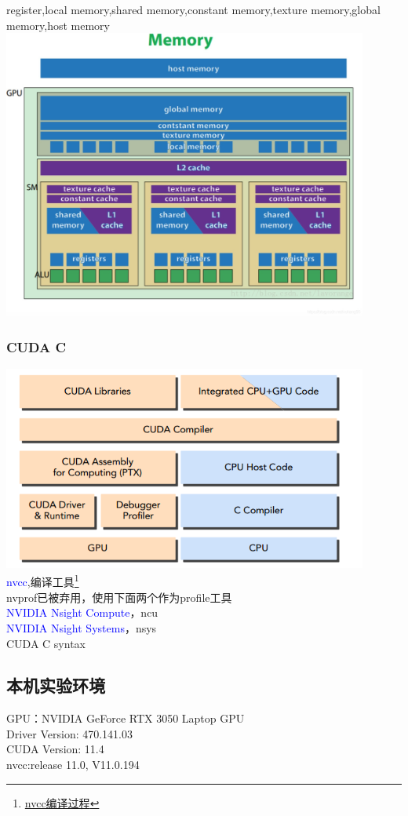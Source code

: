 register,local memory,shared memory,constant memory,texture memory,global memory,host memory\\
\includegraphics[width=0.9\textwidth]{assets/mem.jpg}\\

\subsubsection{CUDA C}
\noindent

\includegraphics[width=0.9\textwidth]{assets/cudac.png}\\
\textcolor{blue}{nvcc},编译工具\footnote{\href{https://docs.nvidia.com/cuda/cuda-compiler-driver-nvcc/index.html}{nvcc编译过程}}\\
nvprof已被弃用，使用下面两个作为profile工具\\
\textcolor{blue}{NVIDIA Nsight Compute}，ncu  \\
\textcolor{blue}{NVIDIA Nsight Systems}，nsys\\
CUDA C syntax
\subsection{本机实验环境}
\noindent
GPU：NVIDIA GeForce RTX 3050 Laptop GPU\\
Driver Version: 470.141.03   \\
CUDA Version: 11.4\\
nvcc:release 11.0, V11.0.194

